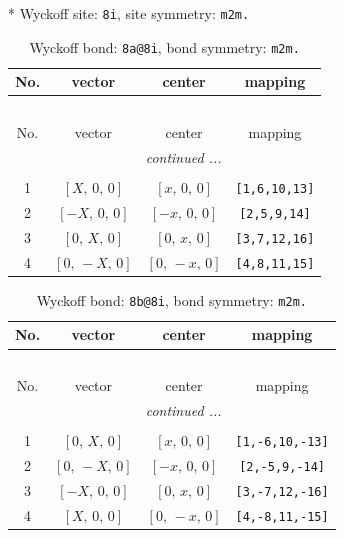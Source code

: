 \documentclass[fleqn,8pt]{jsarticle}
\begin{document}
* Wyckoff site: {\tt 8i}, site symmetry: {\tt m2m.}
\renewcommand{\arraystretch}{1.2}
\begin{longtable}{cccc}
\caption{Wyckoff bond: {\tt 8a@8i}, bond symmetry: {\tt m2m.}}
 \\
 \hline \hline
No. & vector & center & mapping \\ \hline \endfirsthead

\multicolumn{3}{l}{\tablename\ \thetable{}} \\
 \hline \hline
No. & vector & center & mapping \\ \hline \endhead

 \hline \hline
\multicolumn{3}{r}{\footnotesize\it continued ...} \\ \endfoot

 \hline \hline
\multicolumn{3}{r}{} \\ \endlastfoot

1 & $\left[ X,\, 0,\, 0 \right]$ & $\left[ x,\, 0,\, 0 \right]$ & {\tt [1,6,10,13]} \\ \hline
2 & $\left[ - X,\, 0,\, 0 \right]$ & $\left[ - x,\, 0,\, 0 \right]$ & {\tt [2,5,9,14]} \\ \hline
3 & $\left[ 0,\, X,\, 0 \right]$ & $\left[ 0,\, x,\, 0 \right]$ & {\tt [3,7,12,16]} \\ \hline
4 & $\left[ 0,\, - X,\, 0 \right]$ & $\left[ 0,\, - x,\, 0 \right]$ & {\tt [4,8,11,15]} \\
\end{longtable}
\renewcommand{\arraystretch}{1.2}
\begin{longtable}{cccc}
\caption{Wyckoff bond: {\tt 8b@8i}, bond symmetry: {\tt m2m.}}
 \\
 \hline \hline
No. & vector & center & mapping \\ \hline \endfirsthead

\multicolumn{3}{l}{\tablename\ \thetable{}} \\
 \hline \hline
No. & vector & center & mapping \\ \hline \endhead

 \hline \hline
\multicolumn{3}{r}{\footnotesize\it continued ...} \\ \endfoot

 \hline \hline
\multicolumn{3}{r}{} \\ \endlastfoot

1 & $\left[ 0,\, X,\, 0 \right]$ & $\left[ x,\, 0,\, 0 \right]$ & {\tt [1,-6,10,-13]} \\ \hline
2 & $\left[ 0,\, - X,\, 0 \right]$ & $\left[ - x,\, 0,\, 0 \right]$ & {\tt [2,-5,9,-14]} \\ \hline
3 & $\left[ - X,\, 0,\, 0 \right]$ & $\left[ 0,\, x,\, 0 \right]$ & {\tt [3,-7,12,-16]} \\ \hline
4 & $\left[ X,\, 0,\, 0 \right]$ & $\left[ 0,\, - x,\, 0 \right]$ & {\tt [4,-8,11,-15]} \\
\end{longtable}
\end{document}
